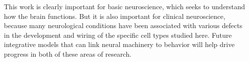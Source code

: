 This work is clearly important for basic neuroscience, which seeks to
understand how the brain functions.  But it is also important for
clinical neuroscience, because many neurological conditions have been
associated with various defects in the development and wiring of the
specific cell types studied here.  Future integrative models that can
link neural machinery to behavior will help drive progress in both of
these areas of research.
\endgroup
